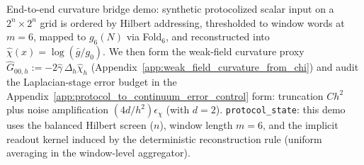\noindent\AuditTag End-to-end curvature bridge demo: synthetic protocolized scalar input on a $2^n\times 2^n$ grid is ordered by Hilbert addressing, thresholded to window words at $m=6$, mapped to $g_6(N)$ via Fold$_6$, and reconstructed into $\widehat\chi(x)=\log(\bar g/g_0)$. We then form the weak-field curvature proxy $\widehat G_{00,h}:=-2\widehat\gamma\,\Delta_h\widehat\chi_h$ (Appendix~\ref{app:weak_field_curvature_from_chi}) and audit the Laplacian-stage error budget in the Appendix~\ref{app:protocol_to_continuum_error_control} form: truncation $C h^2$ plus noise amplification $(4d/h^2)\epsilon_\chi$ (with $d=2$). \texttt{protocol\_state}: this demo uses the balanced Hilbert screen ($n$), window length $m=6$, and the implicit readout kernel induced by the deterministic reconstruction rule (uniform averaging in the window-level aggregator).